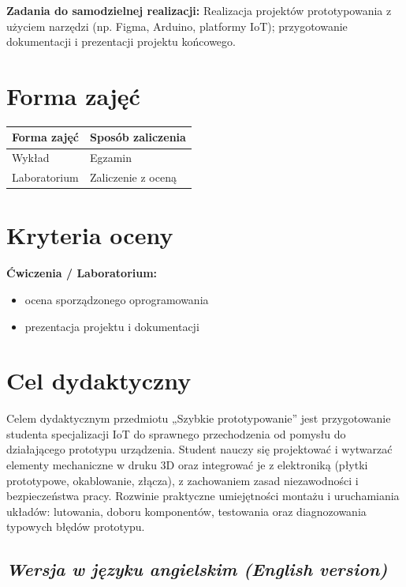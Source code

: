 \documentclass[12pt, a4paper]{article}
\newcommand{\thdrule}{\noalign{\global\setlength{\extrarowheight}{0pt}}}
\newcommand{\thdend}{\noalign{\global\setlength{\extrarowheight}{3pt}}}
\begin{document}
\vspace{4pt}
\noindent\textbf{Zadania do samodzielnej realizacji:} Realizacja projektów prototypowania z użyciem narzędzi (np. Figma, Arduino, platformy IoT); przygotowanie dokumentacji i prezentacji projektu końcowego.

\section{Forma zajęć}

\begin{center}
{\scriptsize
\begin{tabular}{m{5cm}m{8cm}}
\thdrule\toprule
\rowcolor{pjatkRed} {\color{white}\textbf{Forma zajęć}} & {\color{white}\textbf{Sposób zaliczenia}} \\
\midrule\thdend
  \rowcolor{tableRowLight} Wykład & Egzamin \\
  \rowcolor{tableRowAlt} Laboratorium & Zaliczenie z oceną \\
\bottomrule
\end{tabular}}
\end{center}

\section{Kryteria oceny}

\textbf{Ćwiczenia / Laboratorium:}
\begin{itemize}
  \item ocena sporządzonego oprogramowania
  \item prezentacja projektu i dokumentacji
\end{itemize}


\section{Cel dydaktyczny}

Celem dydaktycznym przedmiotu „Szybkie prototypowanie” jest przygotowanie studenta specjalizacji IoT do sprawnego przechodzenia od pomysłu do działającego prototypu urządzenia. Student nauczy się projektować i wytwarzać elementy mechaniczne w druku 3D oraz integrować je z elektroniką (płytki prototypowe, okablowanie, złącza), z zachowaniem zasad niezawodności i bezpieczeństwa pracy. Rozwinie praktyczne umiejętności montażu i uruchamiania układów: lutowania, doboru komponentów, testowania oraz diagnozowania typowych błędów prototypu.

\subsection*{\textit{Wersja w języku angielskim (English version)}}
\end{document}
